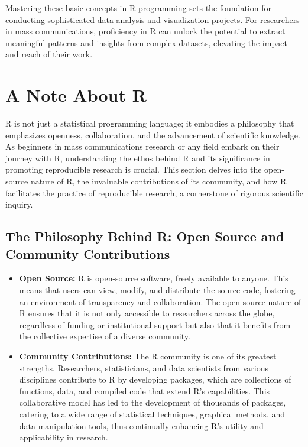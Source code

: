 \documentclass[
]{book}
\begin{document}
Mastering these basic concepts in R programming sets the foundation for conducting sophisticated data analysis and visualization projects. For researchers in mass communications, proficiency in R can unlock the potential to extract meaningful patterns and insights from complex datasets, elevating the impact and reach of their work.

\hypertarget{a-note-about-r}{%
\section{A Note About R}\label{a-note-about-r}}

R is not just a statistical programming language; it embodies a philosophy that emphasizes openness, collaboration, and the advancement of scientific knowledge. As beginners in mass communications research or any field embark on their journey with R, understanding the ethos behind R and its significance in promoting reproducible research is crucial. This section delves into the open-source nature of R, the invaluable contributions of its community, and how R facilitates the practice of reproducible research, a cornerstone of rigorous scientific inquiry.

\hypertarget{the-philosophy-behind-r-open-source-and-community-contributions}{%
\subsection*{The Philosophy Behind R: Open Source and Community Contributions}\label{the-philosophy-behind-r-open-source-and-community-contributions}}

\begin{itemize}
\item
  \textbf{Open Source:} R is open-source software, freely available to anyone. This means that users can view, modify, and distribute the source code, fostering an environment of transparency and collaboration. The open-source nature of R ensures that it is not only accessible to researchers across the globe, regardless of funding or institutional support but also that it benefits from the collective expertise of a diverse community.
\item
  \textbf{Community Contributions:} The R community is one of its greatest strengths. Researchers, statisticians, and data scientists from various disciplines contribute to R by developing packages, which are collections of functions, data, and compiled code that extend R's capabilities. This collaborative model has led to the development of thousands of packages, catering to a wide range of statistical techniques, graphical methods, and data manipulation tools, thus continually enhancing R's utility and applicability in research.
\end{itemize}
\end{document}
